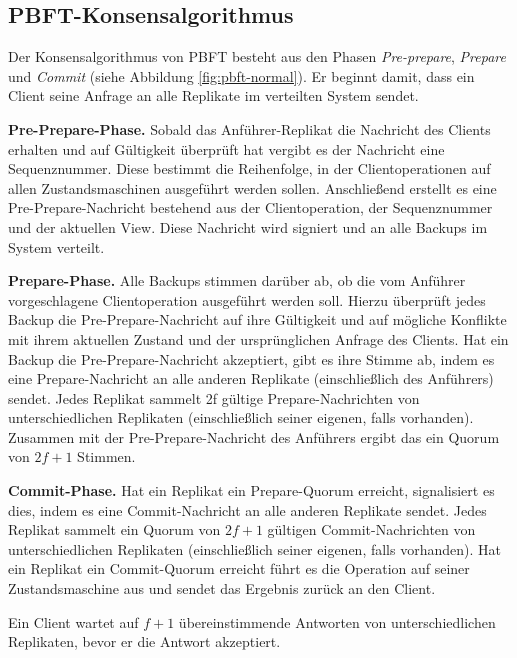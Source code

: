 \documentclass[nonacm,sigconf,natbib=false]{acmart}
\begin{document}
\subsection{PBFT-Konsensalgorithmus}

Der Konsensalgorithmus von PBFT besteht aus den Phasen \emph{Pre-prepare}, \emph{Prepare} und \emph{Commit} (siehe Abbildung \ref{fig:pbft-normal}). Er beginnt damit, dass ein Client seine Anfrage an alle Replikate im verteilten System sendet.

\textbf{Pre-Prepare-Phase.} Sobald das Anführer-Replikat die Nachricht des Clients erhalten und auf Gültigkeit überprüft hat vergibt es der Nachricht eine Sequenznummer. Diese bestimmt die Reihenfolge, in der Clientoperationen auf allen Zustandsmaschinen ausgeführt werden sollen. Anschließend erstellt es eine Pre-Prepare-Nachricht bestehend aus der Clientoperation, der Sequenznummer und der aktuellen View. Diese Nachricht wird signiert und an alle Backups im System verteilt.

\textbf{Prepare-Phase.} Alle Backups stimmen darüber ab, ob die vom Anführer vorgeschlagene Clientoperation ausgeführt werden soll. Hierzu überprüft jedes Backup die Pre-Prepare-Nachricht auf ihre Gültigkeit und auf mögliche Konflikte mit ihrem aktuellen Zustand und der ursprünglichen Anfrage des Clients. Hat ein Backup die Pre-Prepare-Nachricht akzeptiert, gibt es ihre Stimme ab, indem es eine Prepare-Nachricht an alle anderen Replikate (einschließlich des Anführers) sendet. Jedes Replikat sammelt 2f gültige Prepare-Nachrichten von unterschiedlichen Replikaten (einschließlich seiner eigenen, falls vorhanden). Zusammen mit der Pre-Prepare-Nachricht des Anführers ergibt das ein Quorum von $2f+1$ Stimmen.

\textbf{Commit-Phase.} Hat ein Replikat ein Prepare-Quorum erreicht, signalisiert es dies, indem es eine Commit-Nachricht an alle anderen Replikate sendet. Jedes Replikat sammelt ein Quorum von $2f+1$ gültigen Commit-Nachrichten von unterschiedlichen Replikaten (einschließlich seiner eigenen, falls vorhanden). Hat ein Replikat ein Commit-Quorum erreicht führt es die Operation auf seiner Zustandsmaschine aus und sendet das Ergebnis zurück an den Client.

Ein Client wartet auf $f+1$ übereinstimmende Antworten von unterschiedlichen Replikaten, bevor er die Antwort akzeptiert.
\end{document}
